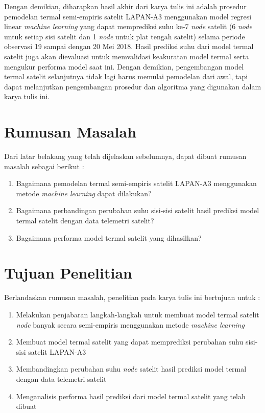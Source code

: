 Dengan demikian, diharapkan hasil akhir dari karya tulis ini adalah prosedur
pemodelan termal semi-empiris satelit LAPAN-A3 menggunakan model regresi linear
\textit{machine learning} yang dapat memprediksi suhu ke-7 \textit{node}
satelit (6 \textit{node} untuk setiap sisi satelit dan 1 \textit{node} untuk
plat tengah satelit) selama periode observasi 19 sampai dengan 20 Mei 2018.
Hasil prediksi suhu dari model termal satelit juga akan dievaluasi untuk
memvalidasi keakuratan model termal serta mengukur performa model saat ini.
Dengan demikian, pengembangan model termal satelit selanjutnya tidak lagi harus
memulai pemodelan dari awal, tapi dapat melanjutkan pengembangan prosedur dan
algoritma yang digunakan dalam karya tulis ini.

\section{Rumusan Masalah}

Dari latar belakang yang telah dijelaskan sebelumnya, dapat dibuat rumusan
masalah sebagai berikut :

\begin{enumerate}
\item Bagaimana pemodelan termal semi-empiris satelit LAPAN-A3 menggunakan metode \textit{machine learning} dapat dilakukan?
\item Bagaimana perbandingan perubahan suhu sisi-sisi satelit hasil prediksi model termal satelit dengan data telemetri satelit?
\item Bagaimana performa model termal satelit yang dihasilkan?
\end{enumerate}

\section{Tujuan Penelitian}

Berlandaskan rumusan masalah, penelitian pada karya tulis ini bertujuan untuk :

\begin{enumerate}
\item Melakukan penjabaran langkah-langkah untuk membuat model termal satelit \textit{node} banyak secara semi-empiris menggunakan metode \textit{machine learning}
\item Membuat model termal satelit yang dapat memprediksi perubahan suhu sisi-sisi satelit LAPAN-A3
\item Membandingkan perubahan suhu \textit{node} satelit hasil prediksi model termal dengan data telemetri satelit
\item Menganalisis performa hasil prediksi dari model termal satelit yang telah dibuat
\end{enumerate}

